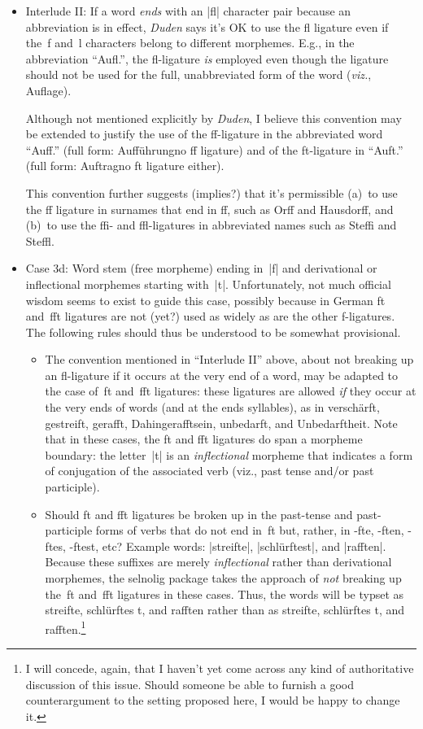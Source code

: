 \documentclass[11pt]{article}
\newcommand{\pkg}[1]{\textsf{#1}}
\begin{document}
\begin{itemize}
\begin{itemize}
\item Interlude II: If a word \emph{ends} with an |fl| character pair because an abbreviation is in effect, \emph{Duden} says it's OK to use the fl ligature even if the~f and~l characters belong to different morphemes. E.g., in the abbreviation \enquote{Aufl.}, the fl-ligature \emph{is} employed even though the ligature should not be used for the full, unabbreviated form of the word (\emph{viz.}, Auflage).

Although not mentioned explicitly by \emph{Duden}, I believe this convention may be extended to justify the use of the ff-ligature in the abbreviated word \enquote{Auff.} (full form: Aufführung\textemdash no ff ligature) and of the ft-ligature in \enquote{Auft.} (full form: Auftrag\textemdash no ft ligature either).

This convention further suggests (implies?) that it's permissible (a)~to use the ff ligature in surnames that end in ff, such as Orff and Hausdorff, and (b)~to use the ffi- and ffl-ligatures in abbreviated names such as Steffi and Steffl. 

\item Case 3d: Word stem (free morpheme) ending in~|f| and derivational or inflectional morphemes starting with~|t|. Unfortunately, not much official wisdom seems to exist to guide this case, possibly because in German ft and~fft ligatures are not (yet?) used as widely as are the other f-ligatures. The following rules should thus be understood to be somewhat provisional.

\begin{itemize}
\item The convention mentioned in \enquote{Interlude II} above, about not breaking up an fl-ligature if it occurs at the very end of a word, may be adapted to the case of~ft and~fft ligatures: these ligatures are allowed \emph{if} they occur at the very ends of words (and at the ends syllables), as in verschärft, gestreift, gerafft, Dahingerafftsein, unbedarft, and Unbedarftheit. Note that in these cases, the ft and fft ligatures do span a morpheme boundary: the letter~|t| is an \emph{inflectional} morpheme that indicates a form of conjugation of the associated verb (viz., past tense and/or past participle).

\item Should ft and fft ligatures be broken up in the past-tense and past-participle forms of verbs that do not end in~ft but, rather, in -fte, -ften, -ftes, -ftest, etc? Example words: |streifte|, |schlürftest|, and |rafften|. Because these suffixes are merely \emph{inflectional} rather than derivational morphemes, the \pkg{selnolig} package takes the approach of \emph{not} breaking up the~ft and~fft ligatures in these cases. Thus, the words will be typset as streifte, schlürftes\kern0pt t, and rafften rather than as streif\breaklig te, schlürf\breaklig tes\kern0pt t, and raff\breaklig ten.\footnote{I will concede, again, that I haven't yet come across any kind of authoritative discussion of this issue. Should someone be able to furnish a good counterargument to the setting proposed here, I would be happy to change it.}


\end{itemize}
\end{itemize}
\end{itemize}
\end{document}
